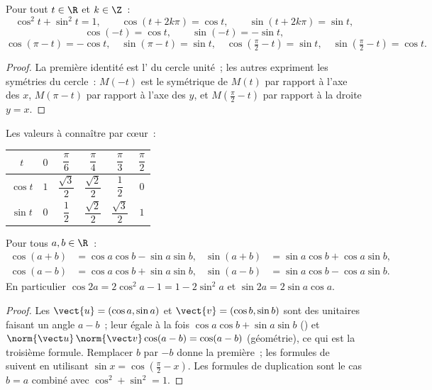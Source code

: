 \begin{proposition}\label{prop:g12:trigo:identities}
Pour tout $t \in \R$ et $k \in \Z$~:
\[
\cos^2 t + \sin^2 t = 1, \qquad
\cos(t + 2k\pi) = \cos t, \qquad
\sin(t + 2k\pi) = \sin t,
\]
\[
\cos(-t) = \cos t, \qquad \sin(-t) = -\sin t,
\]
\[
\cos(\pi - t) = -\cos t, \quad \sin(\pi - t) = \sin t, \quad
\cos\left(\tfrac{\pi}{2} - t\right) = \sin t, \quad
\sin\left(\tfrac{\pi}{2} - t\right) = \cos t .
\]
\end{proposition}

\begin{proof}
La première identité est l' du cercle unité~; les autres expriment
les symétries du cercle~: $M(-t)$ est le symétrique de $M(t)$ par rapport
à l'axe des $x$, $M(\pi - t)$ par rapport à l'axe des $y$, et
$M(\frac\pi2 - t)$ par rapport à la droite $y = x$.
\end{proof}

Les valeurs à connaître par cœur~:
\begin{center}
\begin{tabular}{c|ccccc}
$t$ & $0$ & $\dfrac{\pi}{6}$ & $\dfrac{\pi}{4}$ & $\dfrac{\pi}{3}$ & $\dfrac{\pi}{2}$\\[6pt]
\hline\rule{0pt}{14pt}%
$\cos t$ & $1$ & $\dfrac{\sqrt3}{2}$ & $\dfrac{\sqrt2}{2}$ & $\dfrac12$ & $0$\\[6pt]
$\sin t$ & $0$ & $\dfrac12$ & $\dfrac{\sqrt2}{2}$ & $\dfrac{\sqrt3}{2}$ & $1$
\end{tabular}
\end{center}

\begin{proposition}\label{prop:g12:trigo:addition}
Pour tous $a, b \in \R$~:
\begin{align*}
\cos(a+b) &= \cos a \cos b - \sin a \sin b, &
\sin(a+b) &= \sin a \cos b + \cos a \sin b,\\
\cos(a-b) &= \cos a \cos b + \sin a \sin b, &
\sin(a-b) &= \sin a \cos b - \cos a \sin b.
\end{align*}
En particulier $\cos 2a = 2\cos^2 a - 1 = 1 - 2\sin^2 a$ et
$\sin 2a = 2 \sin a \cos a$.
\end{proposition}

\begin{proof}
Les  $\vect{u} = (\cos a, \sin a)$ et $\vect{v} = (\cos b, \sin b)$
sont des  unitaires faisant un angle $a - b$~; leur  égale à la fois $\cos a\cos b + \sin a \sin b$ () et
$\norm{\vect u}\,\norm{\vect v}\cos(a-b) = \cos(a - b)$ (géométrie), ce
qui est la troisième formule. Remplacer $b$ par $-b$ donne la première~;
les formules de  suivent en utilisant
$\sin x = \cos(\frac\pi2 - x)$. Les formules de duplication sont le cas
$b = a$ combiné avec $\cos^2 + \sin^2 = 1$.
\end{proof}

